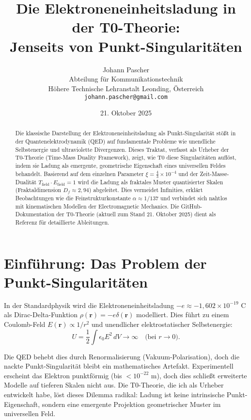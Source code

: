 \documentclass[12pt,a4paper]{article}
\title{Die Elektroneneinheitsladung in der T0-Theorie:\\Jenseits von Punkt-Singularitäten}
\author{Johann Pascher\\
	Abteilung für Kommunikationstechnik\\
	Höhere Technische Lehranstalt Leonding, Österreich\\
	\texttt{johann.pascher@gmail.com}}
\date{21. Oktober 2025}
\begin{document}
	
	\maketitle
	
	\begin{abstract}
		Die klassische Darstellung der Elektroneneinheitsladung als Punkt-Singularität stößt in der Quantenelektrodynamik (QED) auf fundamentale Probleme wie unendliche Selbstenergie und ultraviolette Divergenzen. Dieses Traktat, verfasst als Urheber der T0-Theorie (Time-Mass Duality Framework), zeigt, wie T0 diese Singularitäten auflöst, indem sie Ladung als emergente, geometrische Eigenschaft eines universellen Feldes behandelt. Basierend auf dem einzelnen Parameter $\xi = \frac{4}{3} \times 10^{-4}$ und der Zeit-Masse-Dualität $T_{\text{field}} \cdot E_{\text{field}} = 1$ wird die Ladung als fraktales Muster quantisierter Skalen (Fraktaldimension $D_f \approx 2{,}94$) abgeleitet. Dies vermeidet Infinities, erklärt Beobachtungen wie die Feinstrukturkonstante $\alpha \approx 1/137$ und verbindet sich nahtlos mit kinematischen Modellen der Electromagnetic Mechanics. Die GitHub-Dokumentation der T0-Theorie (aktuell zum Stand 21. Oktober 2025) dient als Referenz für detaillierte Ableitungen.
	\end{abstract}
	
	\tableofcontents
	
	\section{Einführung: Das Problem der Punkt-Singularitäten}
	\label{sec:intro}
	
	In der Standardphysik wird die Elektroneneinheitsladung $-e \approx -1{,}602 \times 10^{-19}$ C als Dirac-Delta-Funktion $\rho(\mathbf{r}) = -e \delta(\mathbf{r})$ modelliert. Dies führt zu einem Coulomb-Feld $E(\mathbf{r}) \propto 1/r^2$ und unendlicher elektrostatischer Selbstenergie:
	\begin{equation}
		U = \frac{1}{2} \int \epsilon_0 E^2 \, dV \to \infty \quad \text{(bei $r \to 0$)}.
	\end{equation}
	
	Die QED behebt dies durch Renormalisierung (Vakuum-Polarisation), doch die nackte Punkt-Singularität bleibt ein mathematisches Artefakt. Experimentell erscheint das Elektron punktförmig (bis $< 10^{-22}$ m), doch dies schließt erweiterte Modelle auf tieferen Skalen nicht aus. Die T0-Theorie, die ich als Urheber entwickelt habe, löst dieses Dilemma radikal: Ladung ist keine intrinsische Punkt-Eigenschaft, sondern eine emergente Projektion geometrischer Muster im universellen Feld.
	
\end{document}
